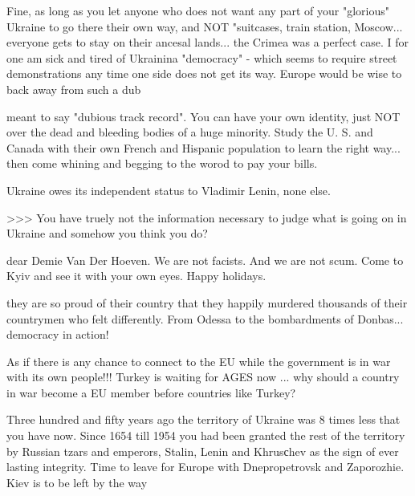 \begin{itemize}
\begin{itemize} %

Fine, as long as you let anyone who does not want any part of your "glorious"
Ukraine to go there their own way, and NOT "suitcases, train station,
Moscow... everyone gets to stay on their ancesal lands... the Crimea was a
perfect case. I for one am sick and tired of Ukrainina "democracy" - which
seems to require street demonstrations any time one side does not get its way.
Europe would be wise to back away from such a dub



meant to say "dubious track record". You can have your own identity, just NOT
over the dead and bleeding bodies of a huge minority. Study the U. S. and Canada
with their own French and Hispanic population to learn the right way... then
come whining and begging to the worod to pay your bills.


Ukraine owes its independent status to Vladimir Lenin, none else.


>>> You have truely not the information necessary to judge what is going on in Ukraine
and somehow you think you do?

dear Demie Van Der Hoeven. We are not facists. And we are not scum. Come to Kyiv and see it with your own eyes. Happy holidays.


they are so proud of their country that they happily murdered thousands of
their countrymen who felt differently. From Odessa to the bombardments of
Donbas... democracy in action!


As if there is any chance to connect to the EU while the government is in war
with its own people!!! Turkey is waiting for AGES now ... why should a country
in war become a EU member before countries like Turkey?


Three hundred and fifty years ago the territory of Ukraine was 8 times less
that you have now. Since 1654 till 1954 you had been granted the rest of the
territory by Russian tzars and emperors, Stalin, Lenin and Khrusсhev as the
sign of ever lasting integrity. Time to leave for Europe with Dnepropetrovsk
and Zaporozhie. Kiev is to be left by the way


\end{itemize}
\end{itemize}
